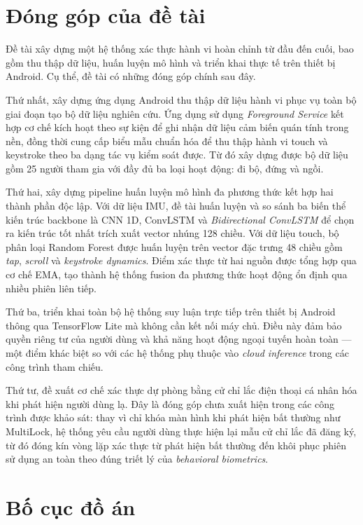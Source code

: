 \documentclass[../DoAn.tex]{subfiles}
\begin{document}
    \section{Đóng góp của đề tài}
    \label{sec:donggop}

    Đề tài xây dựng một hệ thống xác thực hành vi hoàn chỉnh từ đầu đến cuối, bao gồm thu thập dữ liệu, huấn luyện mô hình và triển khai thực tế trên thiết bị Android. Cụ thể, đề tài có những đóng góp chính sau đây.

    Thứ nhất, xây dựng ứng dụng Android thu thập dữ liệu hành vi phục vụ toàn bộ giai đoạn tạo bộ dữ liệu nghiên cứu. Ứng dụng sử dụng \textit{Foreground Service} kết hợp cơ chế kích hoạt theo sự kiện để ghi nhận dữ liệu cảm biến quán tính trong nền, đồng thời cung cấp biểu mẫu chuẩn hóa để thu thập hành vi touch và keystroke theo ba dạng tác vụ kiểm soát được. Từ đó xây dựng được bộ dữ liệu gồm 25 người tham gia với đầy đủ ba loại hoạt động: đi bộ, đứng và ngồi.

    Thứ hai, xây dựng pipeline huấn luyện mô hình đa phương thức kết hợp hai thành phần độc lập. Với dữ liệu IMU, đề tài huấn luyện và so sánh ba biến thể kiến trúc backbone là CNN 1D, ConvLSTM và \textit{Bidirectional ConvLSTM} để chọn ra kiến trúc tốt nhất trích xuất vector nhúng 128 chiều. Với dữ liệu touch, bộ phân loại Random Forest được huấn luyện trên vector đặc trưng 48 chiều gồm \textit{tap}, \textit{scroll} và \textit{keystroke dynamics}. Điểm xác thực từ hai nguồn được tổng hợp qua cơ chế EMA, tạo thành hệ thống fusion đa phương thức hoạt động ổn định qua nhiều phiên liên tiếp.

    Thứ ba, triển khai toàn bộ hệ thống suy luận trực tiếp trên thiết bị Android thông qua TensorFlow Lite mà không cần kết nối máy chủ. Điều này đảm bảo quyền riêng tư của người dùng và khả năng hoạt động ngoại tuyến hoàn toàn --- một điểm khác biệt so với các hệ thống phụ thuộc vào \textit{cloud inference} trong các công trình tham chiếu.

    Thứ tư, đề xuất cơ chế xác thực dự phòng bằng cử chỉ lắc điện thoại cá nhân hóa khi phát hiện người dùng lạ. Đây là đóng góp chưa xuất hiện trong các công trình được khảo sát: thay vì chỉ khóa màn hình khi phát hiện bất thường như MultiLock, hệ thống yêu cầu người dùng thực hiện lại mẫu cử chỉ lắc đã đăng ký, từ đó đóng kín vòng lặp xác thực từ phát hiện bất thường đến khôi phục phiên sử dụng an toàn theo đúng triết lý của \textit{behavioral biometrics}.

    \section{Bố cục đồ án}
    \label{sec:bocuc}
\end{document}

